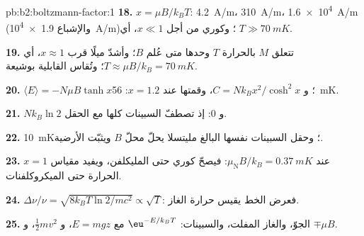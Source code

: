 \begin{solution}{pb:b2:boltzmann-factor:1}
\textbf{18.} $x = \mu B/k_BT$: \qty{4.2}{A/m}، \qty{310}{A/m}، \qty{1.6e4}{A/m}
(والإشباع \qty{1.9e4}{A/m})؛ وكوري من أجل $x \ll 1$، أي $T \gg \qty{70}{mK}$.

\textbf{19.} تتعلق $M$ بالحرارة $T$ وحدها متى عُلم $B$؛ وأشدّ ميلًا قرب
$x \approx 1$، أي $T \approx \mu B/k_B = \qty{70}{mK}$؛ وتُقاس
القابلية بوشيعة.

\textbf{20.} $\langle E\rangle = -N\mu B\tanh x$؛ و $C = Nk_Bx^2/\cosh^2x$، وقمتها عند
$x = 1.2$: \qty{56}{mK}.

\textbf{21.} $Nk_B\ln 2$ و $0$: إذ تصطفّ السبينات كلها مع الحقل.

\textbf{22.} \qty{10}{mK}؛ وحقل السبينات نفسها البالغ مليتسلا يحلّ محلّ $B$
ويثبّت الأرضية.

\textbf{23.} $x = 1$ عند $\mu_{\text{N}}B/k_B = \qty{0.37}{mK}$: فيصحّ كوري حتى
المليكلفن، ويفيد مقياس الحرارة حتى الميكروكلفنات.

\textbf{24.} $\Delta\nu/\nu = \sqrt{8k_BT\ln2/mc^2} \propto \sqrt T$: فعرض
الخط يقيس حرارة الغاز.

\textbf{25.} الجوّ، والغاز المفلت، والسبينات: $\eu^{-E/k_BT}$ مع $E = mgz$،
و $\tfrac12mv^2$، و $\mp\mu B$.
\end{solution}
